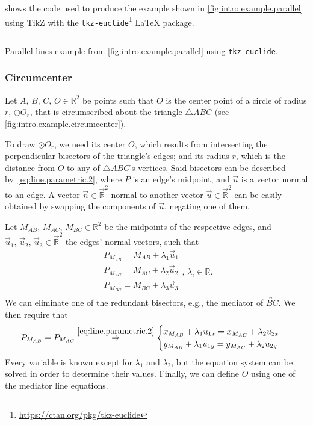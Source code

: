 shows the code used to produce the
example shown in \cref{fig:intro.example.parallel} using \acs{TikZ} with the
\texttt{tkz-euclide}\footnote{\url{https://ctan.org/pkg/tkz-euclide}} \LaTeX{}
package.

\begin{listing}[htb]
  \inputminted{latex}{tikz/ex-parallel.tikz}
  \caption[Parallel lines example using \texttt{tkz-euclide}]{
    Parallel lines example from \cref{fig:intro.example.parallel} using
    \texttt{tkz-euclide}.}%
  \label{lst:intro.example.parallel.tikz}
\end{listing}

\subsubsection{Circumcenter}%
\label{sec:intro.examples.circumcenter}

Let $A,\, B,\, C,\, O \in \mathbb{R}^2$ be points such that $O$ is the center
point of a circle of radius $r$, $\odot O_r$, that is circumscribed about the
triangle $\triangle ABC$ (see \cref{fig:intro.example.circumcenter}).

To draw $\odot O_r$, we need its center $O$, which results from intersecting the
perpendicular bisectors of the triangle's edges; and its radius $r$, which is
the distance from $O$ to any of $\triangle ABC$'s vertices.  Said bisectors can
be described by~\cref{eq:line.parametric.2}, where $P$ is an edge's midpoint,
and $\vec{u}$ is a vector normal to an edge.  A vector $\vec{n} \in
\vec{\mathbb{R}}^2$ normal to another vector $\vec{u} \in \vec{\mathbb{R}}^2$
can be easily obtained by swapping the components of $\vec{u}$, negating one of
them.

Let $M_{AB},\, M_{AC},\, M_{BC} \in \mathbb{R}^2$ be the midpoints of the
respective edges, and $\vec{u}_1,\,\vec{u}_2,\,\vec{u}_3 \in \vec{\mathbb{R}}^2$
the edges' normal vectors, such that
\[
  \begin{split}
    P_{M_{AB}} = M_{AB} + \lambda_1 \vec{u}_1 \\
    P_{M_{AC}} = M_{AC} + \lambda_2 \vec{u}_2 \\
    P_{M_{BC}} = M_{BC} + \lambda_3 \vec{u}_3 \\
  \end{split},\,\lambda_i \in \mathbb{R}.
\]
We can eliminate one of the redundant bisectors, e.g., the mediator of
$\overleftrightarrow{BC}$.  We then require that
\[
  P_{M_{AB}} = P_{M_{AC}} \stackrel{\eqref{eq:line.parametric.2}}{\Rightarrow}
  \begin{cases}
    x_{M_{AB}} + \lambda_1 u_{1x} = x_{M_{AC}} + \lambda_2 u_{2x} \\
    y_{M_{AB}} + \lambda_1 u_{1y} = y_{M_{AC}} + \lambda_2 u_{2y} \\
  \end{cases}.
\]
Every variable is known except for $\lambda_1$ and $\lambda_2$, but the equation
system can be solved in order to determine their values.  Finally, we can define
$O$ using one of the mediator line equations.


